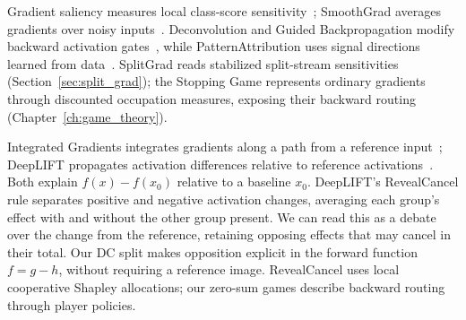 Gradient saliency measures local class-score sensitivity~\parencite{Simonyan2014}; SmoothGrad averages gradients over noisy inputs~\parencite{Smilkov2017}. Deconvolution and Guided Backpropagation modify backward activation gates~\parencite{ZeilerFergus2014,Springenberg2015}, while PatternAttribution uses signal directions learned from data~\parencite{Kindermans2018PatternAttribution}. SplitGrad reads stabilized split-stream sensitivities (Section~\ref{sec:split_grad}); the Stopping Game represents ordinary gradients through discounted occupation measures, exposing their backward routing (Chapter~\ref{ch:game_theory}).

Integrated Gradients integrates gradients along a path from a reference input~\parencite{Sundararajan2017}; DeepLIFT propagates activation differences relative to reference activations~\parencite{Shrikumar2017}. Both explain $f(x)-f(x_0)$ relative to a baseline $x_0$. DeepLIFT's RevealCancel rule separates positive and negative activation changes, averaging each group's effect with and without the other group present. We can read this as a debate over the change from the reference, retaining opposing effects that may cancel in their total. Our DC split makes opposition explicit in the forward function $f=g-h$, without requiring a reference image. RevealCancel uses local cooperative Shapley allocations; our zero-sum games describe backward routing through player policies.

